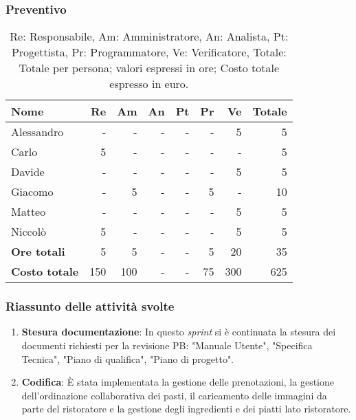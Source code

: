 \subsubsection{Preventivo}

\begin{table}[H]
	\centering
	\begin{tabular}{l|r|r|r|r|r|r|r}
		\textbf{Nome}         & \textbf{Re} & \textbf{Am} & \textbf{An} & \textbf{Pt} & \textbf{Pr} & \textbf{Ve} & \textbf{Totale} \\
		\hline
		Alessandro            & -           & -           & -           & -           & -           & 5           & 5              \\
		Carlo                 & 5           & -           & -           & -           & -           & -           & 5              \\
		Davide                & -           & -           & -           & -           & -           & 5           & 5              \\
		Giacomo               & -           & 5           & -           & -           & 5           & -           & 10              \\
		Matteo                & -           & -           & -           & -           & -           & 5           & 5              \\
		Niccolò               & 5           & -           & -           & -           & -            & 5           & 5              \\
		\hline
		\textbf{Ore totali}   & 5           & 5           & -           & -          & 5          & 20          & 35              \\
		\textbf{Costo totale} & 150         & 100         & -           & -         & 75         & 300         & 625
	\end{tabular}
	\caption{Re: Responsabile, Am: Amministratore, An: Analista, Pt: Progettista,
		Pr: Programmatore, Ve: Verificatore, Totale: Totale per persona; valori espressi in ore; Costo totale espresso in euro.}
\end{table}

\subsubsection{Riassunto delle attività svolte}

\begin{enumerate}
	\item \textbf{Stesura documentazione}: In questo \textit{sprint} si è continuata la stesura dei documenti richiesti per la revisione PB: "Manuale Utente", "Specifica Tecnica", "Piano di qualifica", "Piano di progetto".

	\item \textbf{Codifica}: È stata implementata la gestione delle prenotazioni, la gestione dell'ordinazione collaborativa dei pasti, il caricamento delle immagini da parte del ristoratore e la gestione degli ingredienti e dei piatti lato ristoratore.
\end{enumerate}

